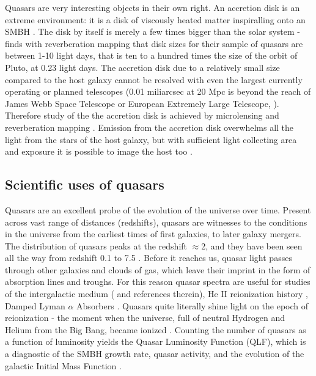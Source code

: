 \documentclass[modern]{aastex62}
\begin{document}
Quasars are very interesting objects in their own right. An accretion disk is an extreme environment: it is a disk of viscously heated matter inspiralling onto an SMBH \citep{ruan2017}. The disk by itself is merely a few times bigger than the solar system - \cite{mudd2017} finds with reverberation  mapping that disk sizes for their sample of quasars are between 1-10 light days, that is ten to a hundred times the size of the orbit of Pluto, at 0.23 light days. 
The accretion disk due to a relatively small size compared to the host galaxy cannot be resolved with even the largest currently operating or planned telescopes (0.01 miliarcsec at 20 Mpc is beyond the reach of James Webb Space Telescope or European Extremely Large Telescope, \citealt{gardner2006,dioaliti2015}). Therefore study of the the accretion disk is achieved by microlensing \citep{agol1999, jimenez2012} and reverberation mapping \citep{jiang2017, mudd2017}.  Emission from the accretion disk overwhelms all the light from the stars of the host galaxy, but with sufficient light collecting area and exposure it is possible to image the host too \citep{hutchings2002,kotilainen2013, falomo2014, liuzzo2016, bayliss2017}. 

\subsection{Scientific uses of quasars}
Quasars are an excellent probe of the evolution of the universe over time. Present across vast range of distances (redshifts), quasars are witnesses to the conditions in the universe from the earliest times of first galaxies, to later galaxy mergers.  The distribution of quasars peaks at the redshift $\approx$2, and they have been seen all the way from redshift 0.1 to 7.5 \citep{paris2017, banados2018}. Before it reaches us, quasar light passes through other galaxies and clouds of gas, which leave their imprint  in the form of absorption lines and troughs.  For this reason quasar spectra are useful  for studies of the intergalactic medium (\citealt{prochaska2014} and references therein),  He II reionization history \citep{khrykin2017}, Damped Lyman $\alpha$ Absorbers \citep{wolfe2005,murphy2016,parks2018}.  Quasars quite literally shine light on the epoch of reionization - the moment when the universe, full of neutral Hydrogen and Helium from the Big Bang, became ionized \citep{glikman2011, masters2012, ross2013}. Counting the number of quasars as a function of luminosity yields the Quasar Luminosity Function (QLF), which is a diagnostic of the SMBH growth rate, quasar activity, and the evolution of the galactic Initial Mass Function \citep{schawinski2012,mcgreer2013,alsayyad2016}. 
\end{document}
